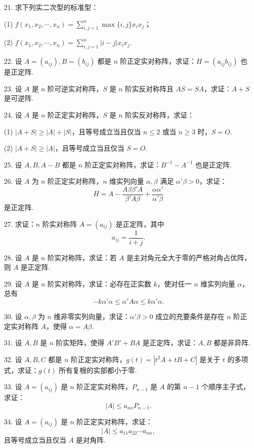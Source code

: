 \documentclass[UTF8, 12pt, fontset=fandol, oneside]{ctexart}
\begin{document}
21. 求下列实二次型的标准型：

(1) $f(x_1,x_2,\cdots,x_n)=\displaystyle\sum_{i,j=1}^n \max\{i,j\}x_ix_j$；

(2) $f(x_1,x_2,\cdots,x_n)=\displaystyle\sum_{i,j=1}^n |i-j|x_ix_j$.

22. 设 $A=(a_{ij}),B=(b_{ij})$ 都是 $n$ 阶正定实对称阵，求证：$H=(a_{ij}b_{ij})$ 也是正定阵.

23. 设 $A$ 是 $n$ 阶可逆实对称阵，$S$ 是 $n$ 阶实反对称阵且 $AS=SA$，求证：$A+S$ 是可逆阵.

24. 设 $A$ 是 $n$ 阶正定实对称阵，$S$ 是 $n$ 阶实反对称阵，求证：

(1) $|A+S|\geq |A|+|S|$，且等号成立当且仅当 $n\leq 2$ 或当 $n\geq 3$ 时，$S=O$.

(2) $|A+S|\geq |A|$，且等号成立当且仅当 $S=O$.

25. 设 $A,B,A-B$ 都是 $n$ 阶正定实对称阵，求证：$B^{-1}-A^{-1}$ 也是正定阵.

26. 设 $A$ 为 $n$ 阶正定实对称阵，$n$ 维实列向量 $\alpha,\beta$ 满足 $\alpha'\beta>0$，求证：
\[
H=A-\frac{A\beta\beta'A}{\beta'A\beta}+\frac{\alpha\alpha'}{\alpha'\beta}
\]
是正定阵.

27. 求证：$n$ 阶实对称阵 $A=(a_{ij})$ 是正定阵，其中
\[
a_{ij}=\frac{1}{i+j}.
\]

28. 设 $A$ 是 $n$ 阶实对称阵，求证：若 $A$ 是主对角元全大于零的严格对角占优阵，则 $A$ 是正定阵.

29. 设 $A$ 是 $n$ 阶实对称阵，求证：必存在正实数 $k$，使对任一 $n$ 维实列向量 $\alpha$，总有
\[
-k\alpha'\alpha\leq \alpha'A\alpha\leq k\alpha'\alpha.
\]

30. 设 $\alpha,\beta$ 为 $n$ 维非零实列向量，求证：$\alpha'\beta>0$ 成立的充要条件是存在 $n$ 阶正定实对称阵 $A$，使得 $\alpha=A\beta$.

31. 设 $A,B$ 是 $n$ 阶实矩阵，使得 $A'B'+BA$ 是正定阵，求证：$A,B$ 都是非异阵.

32. 设 $A,B,C$ 都是 $n$ 阶正定实对称阵，$g(t)=|t^2A+tB+C|$ 是关于 $t$ 的多项式，求证：$g(t)$ 所有复根的实部都小于零.

33. 设 $A=(a_{ij})$ 是 $n$ 阶正定实对称阵，$P_{n-1}$ 是 $A$ 的第 $n-1$ 个顺序主子式，求证：
\[
|A|\leq a_{nn}P_{n-1}.
\]

34. 设 $A=(a_{ij})$ 是 $n$ 阶正定实对称阵，求证：
\[
|A|\leq a_{11}a_{22}\cdots a_{nn},
\]
且等号成立当且仅当 $A$ 是对角阵.
\end{document}
